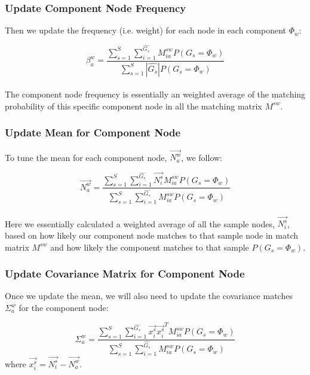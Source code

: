 \subsubsection{Update Component Node Frequency}

Then we update the frequency (i.e. weight) for each node in each component $\Phi_w$:

\begin{equation} 
\beta^w_a=\frac{\sum^S_{s=1}\sum^{\widehat{G_s}}_{i=1}M^{sw}_{ia}P(G_s=\Phi_w)}{\sum^S_{s=1}|\widehat{G_s}|P(G_s=\Phi_w)}
\end{equation}\\

The component node frequency is essentially an weighted average of the matching probability of this specific component node in all the matching matrix $M^{sw}$.\\

\subsubsection{Update Mean for Component Node}

To tune the mean for each component node, $\overrightarrow{N^w_a}$, we follow:

\begin{equation} 
\overrightarrow{N^w_a}=\frac{\sum^S_{s=1}\sum^{\widehat{G_s}}_{i=1}\overrightarrow{N^s_i}M^{sw}_{ia}P(G_s=\Phi_w)}{\sum^S_{s=1}\sum^{\widehat{G_s}}_{i=1}M^{sw}_{ia}P(G_s=\Phi_w)}
\end{equation}\\

Here we essentially calculated a weighted average of all the sample nodes, $\overrightarrow{N^s_i}$, based on how likely our component node matches to that sample node in match matrix $M^{sw}$ and how likely the component matches to that sample $P(G_s=\Phi_w)$.\\

\subsubsection{Update Covariance Matrix for Component Node}

Once we update the mean, we will also need to update the covariance matches $\Sigma^w_a$ for the component node:

\begin{equation} 
\Sigma^w_a=\frac{\sum^S_{s=1}\sum^{\widehat{G_s}}_{i=1}\overrightarrow{x^s_i}\overrightarrow{x^s_i}^TM^{sw}_{ia}P(G_s=\Phi_w)}{\sum^S_{s=1}\sum^{\widehat{G_s}}_{i=1}M^{sw}_{ia}P(G_s=\Phi_w)}
\end{equation}
where $\overrightarrow{x^s_i} = \overrightarrow{N^s_i} - \overrightarrow{N^w_a}$.\\

